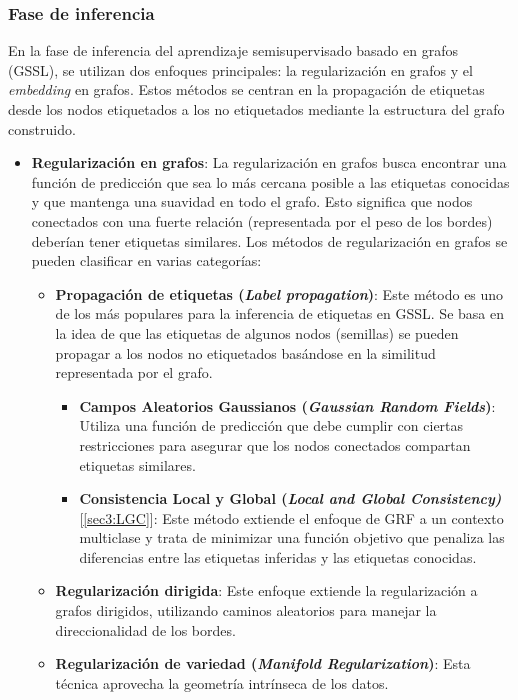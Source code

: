 \subsubsection{Fase de inferencia}
En la fase de inferencia del aprendizaje semisupervisado basado en grafos (GSSL), se utilizan dos enfoques principales: la regularización en grafos y el \textit{embedding} en grafos. Estos métodos se centran en la propagación de etiquetas desde los nodos etiquetados a los no etiquetados mediante la estructura del grafo construido.
\begin{itemize}
	\item \textbf{Regularización en grafos}: La regularización en grafos busca encontrar una función de predicción que sea lo más cercana posible a las etiquetas conocidas y que mantenga una suavidad en todo el grafo. Esto significa que nodos conectados con una fuerte relación (representada por el peso de los bordes) deberían tener etiquetas similares. Los métodos de regularización en grafos se pueden clasificar en varias categorías:
	\begin{itemize}
		\item \textbf{Propagación de etiquetas (\textit{Label propagation})}: Este método es uno de los más populares para la inferencia de etiquetas en GSSL. Se basa en la idea de que las etiquetas de algunos nodos (semillas) se pueden propagar a los nodos no etiquetados basándose en la similitud representada por el grafo.
		\begin{itemize}
			\item \textbf{Campos Aleatorios Gaussianos (\textit{Gaussian Random Fields})}: Utiliza una función de predicción que debe cumplir con ciertas restricciones para asegurar que los nodos conectados compartan etiquetas similares.
			\item \textbf{Consistencia Local y Global (\textit{Local and Global Consistency)}} [\ref{sec3:LGC}]: Este método extiende el enfoque de GRF a un contexto multiclase y trata de minimizar una función objetivo que penaliza las diferencias entre las etiquetas inferidas y las etiquetas conocidas.
		\end{itemize}
		\item \textbf{Regularización dirigida}: Este enfoque extiende la regularización a grafos dirigidos, utilizando caminos aleatorios para manejar la direccionalidad de los bordes.
		\item \textbf{Regularización de variedad (\textit{Manifold Regularization})}:  Esta técnica aprovecha la geometría intrínseca de los datos.
	\end{itemize}

\end{itemize}
